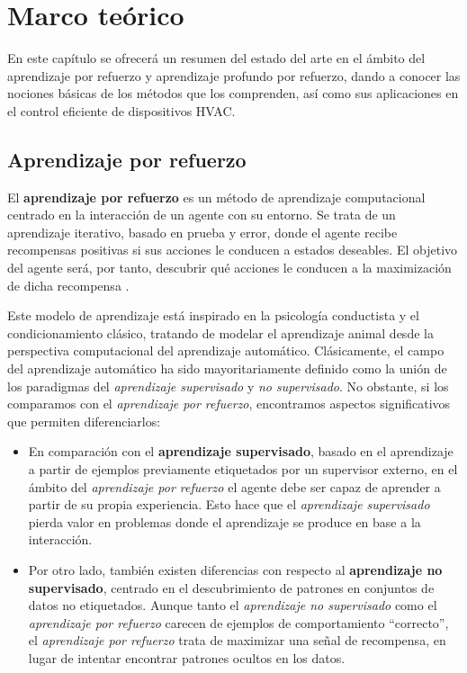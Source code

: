 \chapter{Marco teórico}
\label{ch:2}

En este capítulo se ofrecerá un resumen del estado del arte en el ámbito del aprendizaje por refuerzo y aprendizaje profundo por refuerzo, dando a conocer las nociones básicas de los métodos que los comprenden, así como sus aplicaciones en el control eficiente de dispositivos HVAC.

\section{Aprendizaje por refuerzo}

El \textbf{aprendizaje por refuerzo} es un método de aprendizaje computacional centrado en la interacción de un agente con su entorno. Se trata de un aprendizaje iterativo, basado en prueba y error, donde el agente recibe recompensas positivas si sus acciones le conducen a estados deseables. El objetivo del agente será, por tanto, descubrir qué acciones le conducen a la maximización de dicha recompensa \cite{sutton2018reinforcement}.

Este modelo de aprendizaje está inspirado en la psicología conductista y el condicionamiento clásico, tratando de modelar el aprendizaje animal desde la perspectiva computacional del aprendizaje automático. Clásicamente, el campo del aprendizaje automático ha sido mayoritariamente definido como la unión de los paradigmas del \textit{aprendizaje supervisado} y \textit{no supervisado}. No obstante, si los comparamos con el \textit{aprendizaje por refuerzo}, encontramos aspectos significativos que permiten diferenciarlos:

\begin{itemize}
    \item En comparación con el \textbf{aprendizaje supervisado}, basado en el aprendizaje a partir de ejemplos previamente etiquetados por un supervisor externo, en el ámbito del \textit{aprendizaje por refuerzo} el agente debe ser capaz de aprender a partir de su propia experiencia. Esto hace que el \textit{aprendizaje supervisado} pierda valor en problemas donde el aprendizaje se produce en base a la interacción.
    \item Por otro lado, también existen diferencias con respecto al \textbf{aprendizaje no supervisado}, centrado en el descubrimiento de patrones en conjuntos de datos no etiquetados. Aunque tanto el \textit{aprendizaje no supervisado} como el \textit{aprendizaje por refuerzo} carecen de ejemplos de comportamiento ``correcto'', el \textit{aprendizaje por refuerzo} trata de maximizar una señal de recompensa, en lugar de intentar encontrar patrones ocultos en los datos.
\end{itemize}

